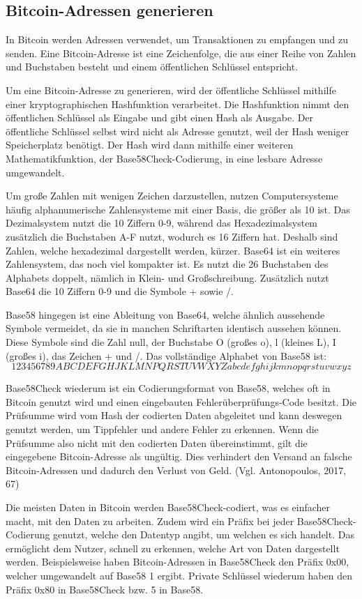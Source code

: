\subsection{Bitcoin-Adressen generieren}
In Bitcoin werden Adressen verwendet, um Transaktionen zu empfangen und zu senden. Eine Bitcoin-Adresse ist eine Zeichenfolge, 
die aus einer Reihe von Zahlen und Buchstaben besteht und einem öffentlichen Schlüssel entspricht.

Um eine Bitcoin-Adresse zu generieren, wird der öffentliche Schlüssel mithilfe einer kryptographischen Hashfunktion verarbeitet.
Die Hashfunktion nimmt den öffentlichen Schlüssel als Eingabe und gibt einen Hash als Ausgabe. Der öffentliche Schlüssel selbst
wird nicht als Adresse genutzt, weil der Hash weniger Speicherplatz benötigt. Der Hash wird dann mithilfe einer weiteren 
Mathematikfunktion, der Base58Check-Codierung, in eine lesbare Adresse umgewandelt.

Um große Zahlen mit wenigen Zeichen darzustellen, nutzen Computersysteme häufig alphanumerische Zahlensysteme mit einer Basis,
die größer als 10 ist. Das Dezimalsystem nutzt die 10 Ziffern 0-9, während das Hexadezimalsystem zusätzlich die Buchstaben A-F
nutzt, wodurch es 16 Ziffern hat. Deshalb sind Zahlen, welche hexadezimal dargestellt werden, kürzer. Base64 ist ein weiteres
Zahlensystem, das noch viel kompakter ist. Es nutzt die 26 Buchstaben des Alphabets doppelt, nämlich in Klein- und Großschreibung.
Zusätzlich nutzt Base64 die 10 Ziffern 0-9 und die Symbole + sowie /.

Base58 hingegen ist eine Ableitung von Base64, welche ähnlich aussehende Symbole vermeidet, da sie in manchen Schriftarten
identisch aussehen können. Diese Symbole sind die Zahl null, der Buchstabe O (großes o), l (kleines L), I (großes i), das 
Zeichen + und /. Das vollständige Alphabet von Base58 ist: \[123456789ABCDEFGHJKLMNPQRSTUVWXYZabcdefghijkmnopqrstuvwxyz\]

Base58Check wiederum ist ein Codierungsformat von Base58, welches oft in Bitcoin genutzt wird und einen eingebauten
Fehlerüberprüfungs-Code besitzt. Die Prüfsumme wird vom Hash der codierten Daten abgeleitet und kann deswegen genutzt werden, 
um Tippfehler und andere Fehler zu erkennen. Wenn die Prüfsumme also nicht mit den codierten Daten übereinstimmt, gilt die
eingegebene Bitcoin-Adresse als ungültig. Dies verhindert den Versand an falsche Bitcoin-Adressen und dadurch den Verlust
von Geld. (Vgl. Antonopoulos, 2017, 67)

Die meisten Daten in Bitcoin werden Base58Check-codiert, was es einfacher macht, mit den Daten zu arbeiten. Zudem wird ein Präfix
bei jeder Base58Check-Codierung genutzt, welche den Datentyp angibt, um welchen es sich handelt. Das ermöglicht dem Nutzer, schnell
zu erkennen, welche Art von Daten dargestellt werden. Beispielsweise haben Bitcoin-Adressen in Base58Check den Präfix 0x00, welcher
umgewandelt auf Base58 1 ergibt. Private Schlüssel wiederum haben den Präfix 0x80 in Base58Check bzw. 5 in Base58.

